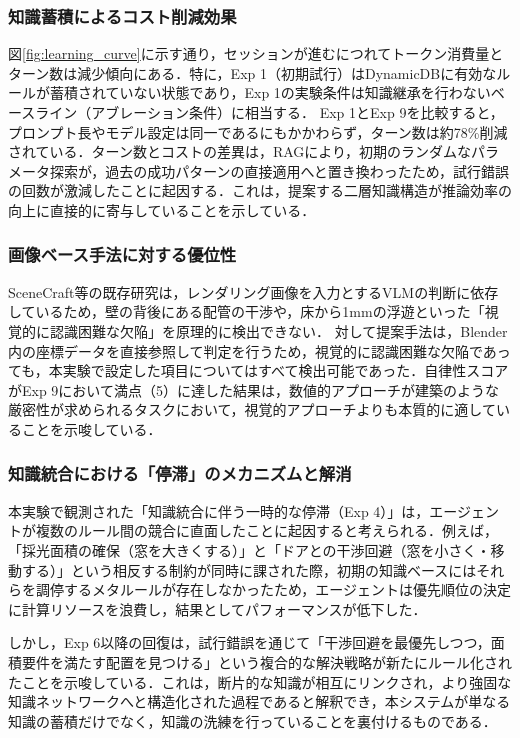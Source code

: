 \documentclass[dvipdfmx, a4paper, 9pt]{deimj}
\begin{document}
\subsubsection{知識蓄積によるコスト削減効果}
図\ref{fig:learning_curve}に示す通り，セッションが進むにつれてトークン消費量とターン数は減少傾向にある．特に，Exp 1（初期試行）はDynamicDBに有効なルールが蓄積されていない状態であり，Exp 1の実験条件は知識継承を行わないベースライン（アブレーション条件）に相当する．
Exp 1とExp 9を比較すると，プロンプト長やモデル設定は同一であるにもかかわらず，ターン数は約78\%削減されている．ターン数とコストの差異は，RAGにより，初期のランダムなパラメータ探索が，過去の成功パターンの直接適用へと置き換わったため，試行錯誤の回数が激減したことに起因する．これは，提案する二層知識構造が推論効率の向上に直接的に寄与していることを示している．

\subsubsection{画像ベース手法に対する優位性}
SceneCraft等の既存研究は，レンダリング画像を入力とするVLMの判断に依存しているため，壁の背後にある配管の干渉や，床から1mmの浮遊といった「視覚的に認識困難な欠陥」を原理的に検出できない．
対して提案手法は，Blender内の座標データを直接参照して判定を行うため，視覚的に認識困難な欠陥であっても，本実験で設定した項目についてはすべて検出可能であった．自律性スコアがExp 9において満点（5）に達した結果は，数値的アプローチが建築のような厳密性が求められるタスクにおいて，視覚的アプローチよりも本質的に適していることを示唆している．

\subsubsection{知識統合における「停滞」のメカニズムと解消}
本実験で観測された「知識統合に伴う一時的な停滞（Exp 4）」は，エージェントが複数のルール間の競合に直面したことに起因すると考えられる．例えば，「採光面積の確保（窓を大きくする）」と「ドアとの干渉回避（窓を小さく・移動する）」という相反する制約が同時に課された際，初期の知識ベースにはそれらを調停するメタルールが存在しなかったため，エージェントは優先順位の決定に計算リソースを浪費し，結果としてパフォーマンスが低下した．

しかし，Exp 6以降の回復は，試行錯誤を通じて「干渉回避を最優先しつつ，面積要件を満たす配置を見つける」という複合的な解決戦略が新たにルール化されたことを示唆している．これは，断片的な知識が相互にリンクされ，より強固な知識ネットワークへと構造化された過程であると解釈でき，本システムが単なる知識の蓄積だけでなく，知識の洗練を行っていることを裏付けるものである．
\end{document}
